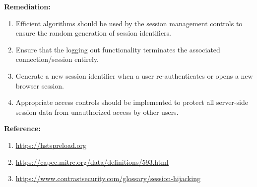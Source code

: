 \documentclass{article}
\begin{document}
\begin{description}[itemsep=2pt, leftmargin=0.2cm]
                            
                    \item \large \textbf{Remediation:}
                            \linespread{1.0}
                            \begin{enumerate}[leftmargin=0.5cm]
                             
                                \item \large Efficient algorithms should be used by the session management controls to ensure the random generation of session identifiers.


                                \item \large  Ensure that the logging out functionality terminates the associated connection/session entirely.

                                \item \large Generate a new session identifier when a user re-authenticates or opens a new browser session.

                                \item \large Appropriate access controls should be implemented to protect all server-side session data from unauthorized access by other users.
                            \end{enumerate}

                    \item \large \textbf{Reference:}
                            \linespread{1.0}
                            \begin{enumerate}[leftmargin=0.5cm, ]
                                
                            \item \large \underline{\href{https://hstspreload.org} {https://hstspreload.org}}

                            \item \large \underline{\href{https://capec.mitre.org/data/definitions/593.html} {https://capec.mitre.org/data/definitions/593.html}}

                            \item \large \underline{\href{https://www.contrastsecurity.com/glossary/session-hijacking} {https://www.contrastsecurity.com/glossary/session-hijacking}}
                            \end{enumerate}
                    
                \end{description}
\end{document}
